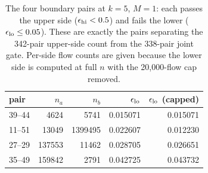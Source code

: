 \begin{table}[t]
\centering
\caption{The four boundary pairs at $k{=}5$, $M{=}1$: each passes the upper side ($\epsilon_{\mathrm{hi}} < 0.5$) and fails the lower ($\epsilon_{\mathrm{lo}} \le 0.05$). These are exactly the pairs separating the 342-pair upper-side count from the 338-pair joint gate. Per-side flow counts are given because the lower side is computed at full $n$ with the 20{,}000-flow cap removed.}
\label{tab:boundary}
\begin{tabular}{lrrrr}
\toprule
pair & $n_a$ & $n_b$ & $\epsilon_{\mathrm{lo}}$ & $\epsilon_{\mathrm{lo}}$ (capped) \\
\midrule
39--44 & 4624 & 5741 & 0.015071 & 0.015071 \\
11--51 & 13049 & 1399495 & 0.022607 & 0.012230 \\
27--29 & 137553 & 11462 & 0.028705 & 0.026651 \\
35--49 & 159842 & 2791 & 0.042725 & 0.043732 \\
\bottomrule
\end{tabular}
\end{table}
